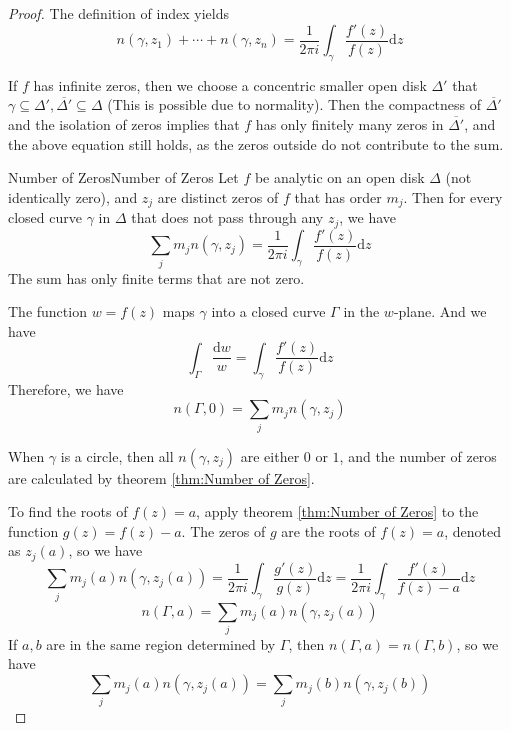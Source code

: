 \documentclass[../main.tex]{subfiles}
\begin{document}
\begin{proof}
The definition of index yields
\begin{equation}
	n(\gamma,z_1) + \cdots + n(\gamma,z_n) = \frac{1}{2\pi i} \int_{\gamma} \frac{f'(z)}{f(z)} \mathrm{d} z
\end{equation}

If $f$ has infinite zeros, then we choose a concentric smaller open disk $\Delta'$ that $\gamma \subseteq \Delta', \overline{\Delta'} \subseteq \Delta$ (This is possible due to normality). Then the compactness of $\overline{\Delta'}$ and the isolation of zeros implies that $f$ has only finitely many zeros in $\overline{\Delta'}$, and the above equation still holds, as the zeros outside do not contribute to the sum.

\begin{theorem}{Number of Zeros}{Number of Zeros}
	Let $f$ be analytic on an open disk $\Delta$ (not identically zero), and $z_j$ are distinct zeros of $f$ that has order $m_j$. Then for every closed curve $\gamma$ in $\Delta$ that does not pass through any $z_j$, we have
	\begin{equation}
		\sum_{j} m_j n(\gamma,z_j) = \frac{1}{2\pi i} \int_{\gamma} \frac{f'(z)}{f(z)} \mathrm{d} z 
	\end{equation}
	The sum has only finite terms that are not zero.
\end{theorem}
The function $w = f(z)$ maps $\gamma$ into a closed curve $\Gamma$ in the $w$-plane. And we have
\begin{equation*}
	\int_{\Gamma} \frac{\mathrm{d} w}{w} = \int_{\gamma} \frac{f'(z)}{f(z)} \mathrm{d} z
\end{equation*}
Therefore, we have
\begin{equation}
	n(\Gamma,0) = \sum_{j} m_j n(\gamma,z_j)
\end{equation}
\begin{remark}
	When $\gamma$ is a circle, then all $n(\gamma,z_j)$ are either $0$ or $1$, and the number of zeros are calculated by theorem \ref{thm:Number of Zeros}.
\end{remark}

To find the roots of $f(z) = a$, apply theorem \ref{thm:Number of Zeros} to the function $g(z) = f(z) - a$. The zeros of $g$ are the roots of $f(z) = a$, denoted as $z_j(a)$, so we have
\begin{equation}
	\sum_{j} m_j(a) n(\gamma,z_j(a)) = \frac{1}{2\pi i} \int_{\gamma} \frac{g'(z)}{g(z)} \mathrm{d} z = \frac{1}{2\pi i} \int_{\gamma} \frac{f'(z)}{f(z)-a} \mathrm{d} z
\end{equation}
\begin{equation}
	n(\Gamma,a) = \sum_{j} m_j(a) n(\gamma,z_j(a))
\end{equation}
If $a,b$ are in the same region determined by $\Gamma$, then $n(\Gamma,a) = n(\Gamma,b)$, so we have
\begin{equation}
	\sum_{j} m_j(a) n(\gamma,z_j(a)) = \sum_{j} m_j(b) n(\gamma,z_j(b))
\end{equation}


\end{proof}
\end{document}
